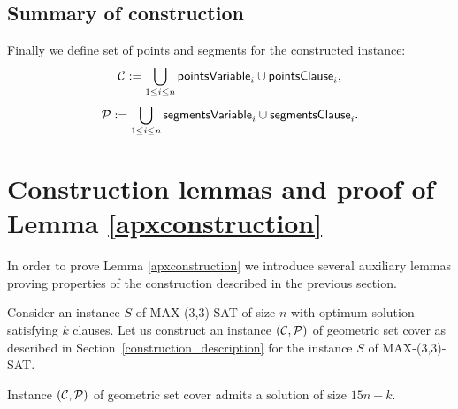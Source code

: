 \subsection{Summary of construction}




Finally we define set of points and segments for the constructed instance:
$$\mathcal{C} := \bigcup_{1 \le i \le n} \mathsf{pointsVariable}_{i} \cup \mathsf{pointsClause}_{i},$$
$$\mathcal{P} := \bigcup_{1 \le i \le n} \mathsf{segmentsVariable}_{i} \cup \mathsf{segmentsClause}_i.$$

\section{Construction lemmas and proof of Lemma \ref{apxconstruction}}

In order to prove Lemma \ref{apxconstruction} we introduce several
auxiliary lemmas proving properties of the construction
described in the previous section.

Consider an instance $S$ of MAX-(3,3)-SAT of size $n$
with optimum solution satisfying $k$ clauses.
Let us construct an instance $(\mathcal{C}, \mathcal{P})$ of geometric set cover
as described in Section~\ref{construction_description}
for the instance $S$ of MAX-(3,3)-SAT.

\begin{lemma}
	\label{construction_correctness}
	Instance $(\mathcal{C}, \mathcal{P})$ of geometric set cover
	admits a solution of size $15n - k$.
\end{lemma}

